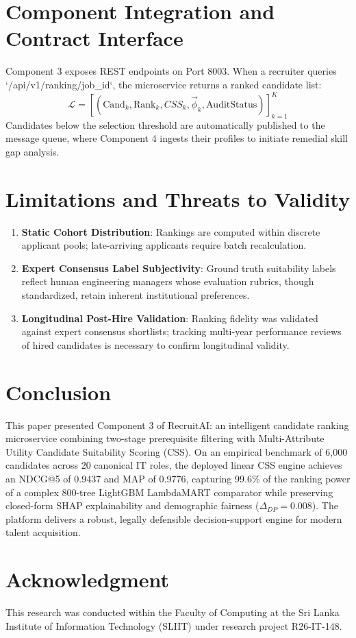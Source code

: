 \documentclass[conference]{IEEEtran}
\begin{document}
\section{Component Integration and Contract Interface}
Component 3 exposes REST endpoints on Port 8003. When a recruiter queries `/api/v1/ranking/{job_id}`, the microservice returns a ranked candidate list:
\begin{equation}
\mathcal{L} = \left[ (\text{Cand}_k, \text{Rank}_k, CSS_k, \vec{\phi}_k, \text{AuditStatus}) \right]_{k=1}^{K}
\end{equation}
Candidates below the selection threshold are automatically published to the message queue, where Component 4 ingests their profiles to initiate remedial skill gap analysis.

\section{Limitations and Threats to Validity}
\begin{enumerate}
    \item \textbf{Static Cohort Distribution}: Rankings are computed within discrete applicant pools; late-arriving applicants require batch recalculation.
    \item \textbf{Expert Consensus Label Subjectivity}: Ground truth suitability labels reflect human engineering managers whose evaluation rubrics, though standardized, retain inherent institutional preferences.
    \item \textbf{Longitudinal Post-Hire Validation}: Ranking fidelity was validated against expert consensus shortlists; tracking multi-year performance reviews of hired candidates is necessary to confirm longitudinal validity.
\end{enumerate}

\section{Conclusion}
This paper presented Component 3 of RecruitAI: an intelligent candidate ranking microservice combining two-stage prerequisite filtering with Multi-Attribute Utility Candidate Suitability Scoring (CSS). On an empirical benchmark of 6,000 candidates across 20 canonical IT roles, the deployed linear CSS engine achieves an NDCG@5 of 0.9437 and MAP of 0.9776, capturing 99.6\% of the ranking power of a complex 800-tree LightGBM LambdaMART comparator while preserving closed-form SHAP explainability and demographic fairness ($\Delta_{DP}=0.008$). The platform delivers a robust, legally defensible decision-support engine for modern talent acquisition.

\section*{Acknowledgment}
This research was conducted within the Faculty of Computing at the Sri Lanka Institute of Information Technology (SLIIT) under research project R26-IT-148.



\end{document}
